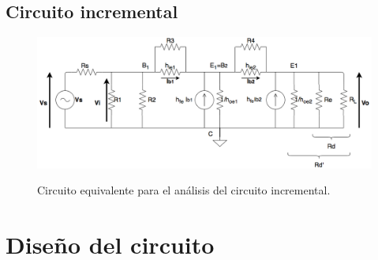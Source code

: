 	\subsection{Circuito incremental}
	
		\begin{figure}[H]
			\centering
			\includegraphics[scale=0.4]{./Imagenes/circ_incremental.png} \\
			\caption{Circuito equivalente para el an\'alisis del circuito incremental.}
			\label{circ_incremental}
		\end{figure}

\section{Diseño del circuito}
